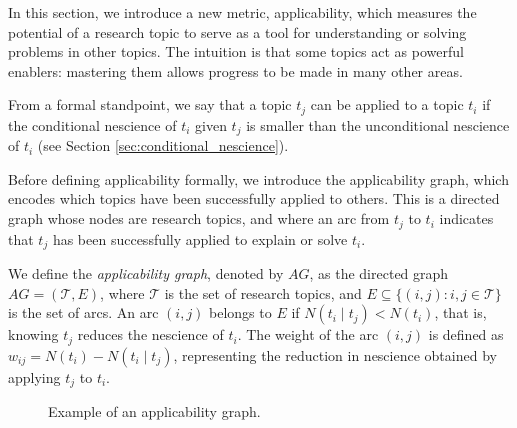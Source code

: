 In this section, we introduce a new metric, applicability, which measures the potential of a research topic to serve as a tool for understanding or solving problems in other topics. The intuition is that some topics act as powerful enablers: mastering them allows progress to be made in many other areas.

From a formal standpoint, we say that a topic $t_j$ can be applied to a topic $t_i$ if the conditional nescience of $t_i$ given $t_j$ is smaller than the unconditional nescience of $t_i$ (see Section \ref{sec:conditional_nescience}).

Before defining applicability formally, we introduce the applicability graph, which encodes which topics have been successfully applied to others. This is a directed graph whose nodes are research topics, and where an arc from $t_j$ to $t_i$ indicates that $t_j$ has been successfully applied to explain or solve $t_i$.

\begin{definition}
\label{def:applicability-graph}
We define the \emph{applicability graph}, denoted by $AG$, as the directed graph $AG = (\mathcal{T}, E)$, where $\mathcal{T}$ is the set of research topics, and $E \subseteq \{ (i,j) : i,j \in \mathcal{T} \}$ is the set of arcs. An arc $(i,j)$ belongs to $E$ if $N(t_i \mid t_j) < N(t_i)$, that is, knowing $t_j$ reduces the nescience of $t_i$. The weight of the arc $(i,j)$ is defined as $w_{ij} = N(t_i) - N(t_i \mid t_j)$, representing the reduction in nescience obtained by applying $t_j$ to $t_i$.
\end{definition}

\begin{figure}[t]
\centering
{}
\caption{\label{fig:ApplicabilityGraph}Example of an applicability graph.}
\end{figure}

